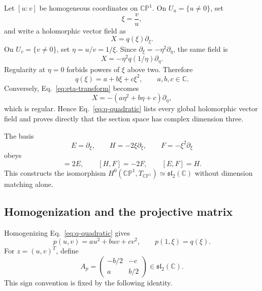 \documentclass[11pt]{article}
\numberwithin{equation}{section}
\newcommand{\CP}{\mathbb{CP}}
\newcommand{\CC}{\mathbb C}
\newcommand{\sltwo}{\mathfrak{sl}_2(\mathbb C)}
\begin{document}
Let \([u:v]\) be homogeneous coordinates on \(\CP^1\).  On
\(U_u=\{u\ne0\}\), set
\begin{equation}
 \xi=\frac vu,
 \label{eq:xi-chart}
\end{equation}
and write a holomorphic vector field as
\begin{equation}
 X=q(\xi)\partial_\xi.
 \label{eq:q-vector}
\end{equation}
On \(U_v=\{v\ne0\}\), set \(\eta=u/v=1/\xi\).  Since
\(\partial_\xi=-\eta^2\partial_\eta\), the same field is
\begin{equation}
 X=-\eta^2q(1/\eta)\partial_\eta.
 \label{eq:eta-transform}
\end{equation}
Regularity at \(\eta=0\) forbids powers of \(\xi\) above two.  Therefore
\begin{equation}
 q(\xi)=a+b\xi+c\xi^2,
 \qquad a,b,c\in\CC.
 \label{eq:q-quadratic}
\end{equation}
Conversely, Eq.~\eqref{eq:eta-transform} becomes
\begin{equation}
 X=-(a\eta^2+b\eta+c)\partial_\eta,
 \label{eq:eta-polynomial}
\end{equation}
which is regular.  Hence Eq.~\eqref{eq:q-quadratic} lists every global
holomorphic vector field and proves directly that the section space has
complex dimension three.

The basis
\begin{equation}
 E=\partial_\xi,
 \qquad H=-2\xi\partial_\xi,
 \qquad F=-\xi^2\partial_\xi
 \label{eq:sl2-vector-basis}
\end{equation}
obeys
\begin{equation}
 [H,E]=2E,
 \qquad [H,F]=-2F,
 \qquad [E,F]=H.
 \label{eq:sl2-brackets}
\end{equation}
This constructs the isomorphism
\(H^0(\CP^1,T_{\CP^1})\simeq\sltwo\) without dimension matching alone.

\subsection{Homogenization and the projective matrix}

Homogenizing Eq.~\eqref{eq:q-quadratic} gives
\begin{equation}
 p(u,v)=au^2+buv+cv^2,
 \qquad p(1,\xi)=q(\xi).
 \label{eq:binary-quadratic}
\end{equation}
For \(z=(u,v)^T\), define
\begin{equation}
 A_p=
 \begin{pmatrix}
 -b/2&-c\\
 a&b/2
 \end{pmatrix}
 \in\sltwo.
 \label{eq:projective-matrix}
\end{equation}
This sign convention is fixed by the following identity.
\end{document}
